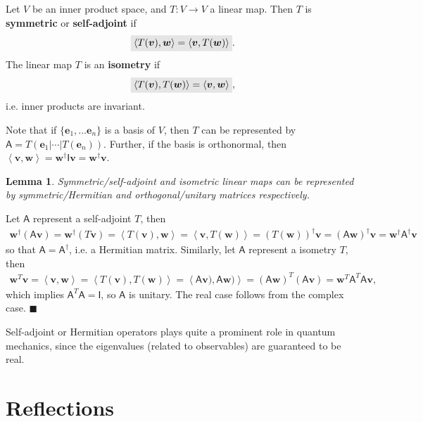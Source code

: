 \documentclass[letter-paper]{tufte-book}
\newtheorem{lemma}[theorem]{\color{pastel-blue}Lemma}
\newenvironment{proof}[1][Proof]{\begin{trivlist}
\item[\hskip \labelsep {\bfseries #1}]}{\end{trivlist}}
\newcommand{\inner}[2]{\left\langle #1, #2\right\rangle}
\newcommand{\As}{{\mathsf{A}}}
\newcommand{\Is}{{\mathsf{I}}}
\newcommand{\eb}{{\boldsymbol{e}}}
\newcommand{\vb}{{\boldsymbol{v}}}
\newcommand{\wb}{{\boldsymbol{w}}}
\newcommand{\qed}{\hfill$\blacksquare$}
\newcommand{\highlight}[1]{\mathchoice%
  {\colorbox{black!10}{$\displaystyle#1$}}%
  {\colorbox{black!10}{$\textstyle#1$}}%
  {\colorbox{black!10}{$\scriptstyle#1$}}%
  {\colorbox{black!10}{$\scriptscriptstyle#1$}}}%
\begin{document}
Let $V$ be an inner product space, and $T: V \to V$ a linear map. Then $T$ is \textbf{symmetric} or \textbf{self-adjoint} if
\begin{align*}
  \highlight{\inner{T(\vb)}{\wb} = \inner{\vb}{T(\wb)}}.
\end{align*}
The linear map $T$ is an \textbf{isometry} if
\begin{align*}
  \highlight{\inner{T(\vb)}{T(\wb)} = \inner{\vb}{\wb}},
\end{align*}
i.e. inner products are invariant.

Note that if $\{\eb_1, \ldots \eb_n\}$ is a basis of $V$, then $T$ can be represented by $\As = T(\eb_1|\cdots|T(\eb_n))$. Further, if the basis is orthonormal, then $\inner{\vb}{\wb} = \wb^\dagger\Is \vb = \wb^\dagger \vb$.

\begin{lemma}
  Symmetric/self-adjoint and isometric linear maps can be represented by symmetric/Hermitian and orthogonal/unitary matrices respectively.
\end{lemma}

\begin{proof}
  Let $\As$ represent a self-adjoint $T$, then
  \begin{align}
    \wb^\dagger (\As\vb) = \wb^\dagger (T\vb) = \inner{T(\vb)}{\wb} = \inner{\vb}{T(\wb)} = (T(\wb))^\dagger \vb = (\As \wb)^\dagger \vb = \wb^\dagger \As^\dagger \vb
  \end{align}
  so that $\As = \As^\dagger$, i.e. a Hermitian matrix. Similarly, let $\As$ represent a isometry $T$, then
  \begin{align}
    \wb^T \vb = \inner{\vb}{\wb} = \inner{T(\vb)}{T(\wb)} = \inner{\As\vb)}{\As\wb)} = (\As\wb)^T (\As\vb) = \wb^T \As^T \As \vb,
  \end{align}
  which implies $\As^T \As = \Is$, so $\As$ is unitary. The real case follows from the complex case. \qed
\end{proof}

Self-adjoint or Hermitian operators plays quite a prominent role in quantum mechanics, since the eigenvalues (related to observables) are guaranteed to be real.


\section{Reflections}
\end{document}
